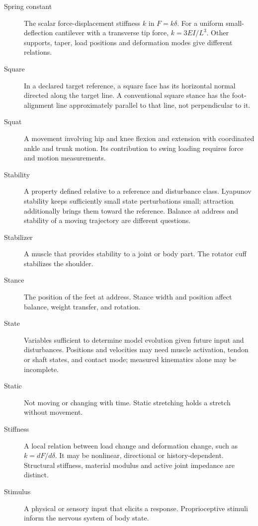 \begin{description}
\item[Spring constant] The scalar force-displacement stiffness $k$ in $F=k\delta$. For a uniform small-deflection cantilever with a transverse tip force, $k=3EI/L^3$. Other supports, taper, load positions and deformation modes give different relations.

\item[Square] In a declared target reference, a square face has its horizontal normal directed along the target line. A conventional square stance has the foot-alignment line approximately parallel to that line, not perpendicular to it.

\item[Squat] A movement involving hip and knee flexion and extension with coordinated ankle and trunk motion. Its contribution to swing loading requires force and motion measurements.

\item[Stability] A property defined relative to a reference and disturbance class. Lyapunov stability keeps sufficiently small state perturbations small; attraction additionally brings them toward the reference. Balance at address and stability of a moving trajectory are different questions.

\item[Stabilizer] A muscle that provides stability to a joint or body part. The rotator cuff stabilizes the shoulder.

\item[Stance] The position of the feet at address. Stance width and position affect balance, weight transfer, and rotation.

\item[State] Variables sufficient to determine model evolution given future input and disturbances. Positions and velocities may need muscle activation, tendon or shaft states, and contact mode; measured kinematics alone may be incomplete.

\item[Static] Not moving or changing with time. Static stretching holds a stretch without movement.

\item[Stiffness] A local relation between load change and deformation change, such as $k=dF/d\delta$. It may be nonlinear, directional or history-dependent. Structural stiffness, material modulus and active joint impedance are distinct.

\item[Stimulus] A physical or sensory input that elicits a response. Proprioceptive stimuli inform the nervous system of body state.


\end{description}
